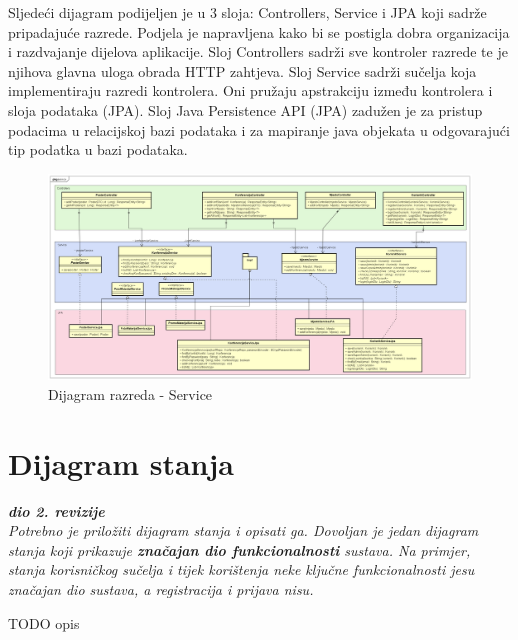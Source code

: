 		\newpage
		Sljedeći dijagram podijeljen je u 3 sloja: Controllers, Service i JPA koji sadrže pripadajuće razrede. Podjela je napravljena kako bi se postigla dobra organizacija i razdvajanje dijelova aplikacije. Sloj Controllers sadrži sve kontroler razrede te je njihova glavna uloga obrada HTTP zahtjeva. Sloj Service sadrži sučelja koja implementiraju razredi kontrolera. Oni pružaju apstrakciju između kontrolera i sloja podataka (JPA). Sloj Java Persistence API (JPA) zadužen je za pristup podacima u relacijskoj bazi podataka i za mapiranje java objekata u odgovarajući tip podatka u bazi podataka.
		\begin{figure}[H]
			\includegraphics[width=\textwidth]{slike/serviceClassDiagram.PNG} %
			\caption{Dijagram razreda - Service}
			\label{fig:dr-service} %
		\end{figure}
			\eject

		\section{Dijagram stanja}


			\textbf{\textit{dio 2. revizije}}\\

			\textit{Potrebno je priložiti dijagram stanja i opisati ga. Dovoljan je jedan dijagram stanja koji prikazuje \textbf{značajan dio funkcionalnosti} sustava. Na primjer, stanja korisničkog sučelja i tijek korištenja neke ključne funkcionalnosti jesu značajan dio sustava, a registracija i prijava nisu. }
			
			TODO opis
			
